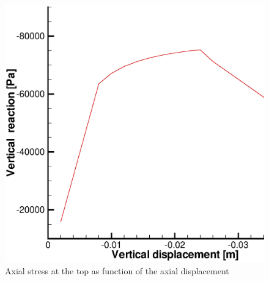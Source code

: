 %
\begin{figure}[htb]
\begin{center}
\includegraphics[scale=0.3]{PART_II/M/m_sdc_s_u.eps}
\end{center}
\vspace*{-4.0ex}
\caption{Axial stress at the top as function of the axial displacement}
 \label{Mp_fig:vreact}
\end{figure}

\clearpage


